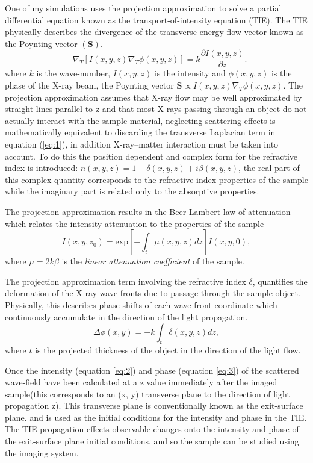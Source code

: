 \documentclass[9pt, a4paper]{article}
\begin{document}
One of my simulations uses the projection approximation to solve a partial differential equation known as the transport-of-intensity equation (TIE). The TIE physically describes the divergence of the transverse energy-flow vector known as the Poynting vector $(\textbf{S})$\cite{PagsTutes}.
\begin{equation}\label{eq:1}
-\nabla_{T} [I(x, y, z) \nabla_{T} \phi(x, y, z)] = k \frac{\partial I (x, y, z)}{\partial z}.
\end{equation}
where $k$ is the wave-number, $I(x, y, z)$ is the intensity and $\phi(x, y, z)$ is the phase of the X-ray beam, the Poynting vector $\textbf{S} \propto I(x, y, z) \nabla_{T} \phi(x, y, z)$.
The projection approximation assumes that X-ray flow may be well approximated by straight lines parallel to z\cite{PagsTutes} and that most X-rays passing through an object do not actually interact with the sample material, neglecting scattering effects is mathematically equivalent to discarding the transverse Laplacian term in equation (\ref{eq:1})\cite{CH49}, in addition X-ray--matter interaction must be taken into account. To do this the position dependent and complex form for the refractive index
is introduced: $n(x, y, z) = 1 - \delta(x, y, z) + i \beta(x, y, z)$, the real part of this complex quantity corresponds to the refractive index properties of the sample while the imaginary part is related only to the absorptive properties\cite{PagsTutes}.

The projection approximation results in the Beer-Lambert law of attenuation which relates the intensity attenuation to the properties of the sample
\begin{equation}\label{eq:2}
I(x, y, z_0) = \mathrm{exp}[-\int_{t} \mu(x, y, z) dz] I(x, y, 0),
\end{equation}
where $\mu = 2k\beta$ is the \textit{linear attenuation coefficient} of the sample.

The projection approximation term involving the refractive index $\delta$, quantifies the deformation of the X-ray wave-fronts due to passage through the sample object. Physically, this describes phase-shifts of each wave-front coordinate which continuously accumulate in the direction of the light propagation.
\begin{equation}\label{eq:3}
\Delta \phi(x, y) = -k \int_{t}\delta(x, y, z)dz,
\end{equation}
where $t$ is the projected thickness of the object in the direction of the light flow.

Once the intensity (equation \ref{eq:2}) and phase (equation \ref{eq:3}) of the scattered wave-ﬁeld have been calculated at a z value immediately after the imaged sample(this corresponds to an (x, y) transverse plane to the direction of light propagation z). This transverse plane is conventionally known as the exit-surface plane. and is used as the initial conditions for the intensity and phase in the TIE.  The TIE propagation 
effects observable changes onto the intensity and phase of the exit-surface plane initial conditions, and so the sample can be studied using the imaging system. 
\end{document}
